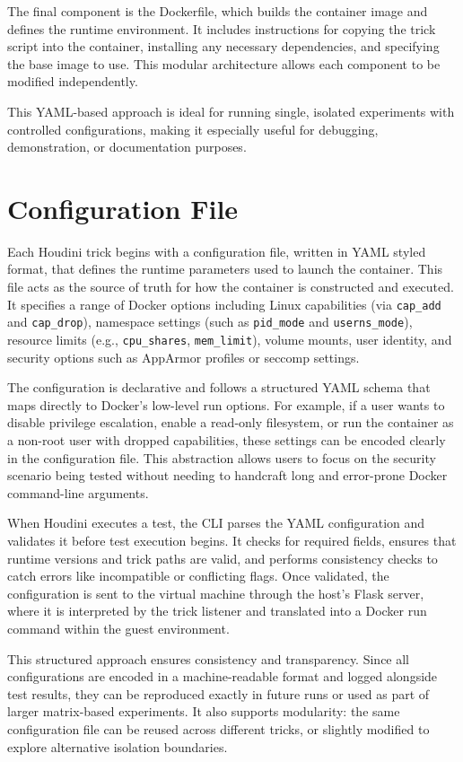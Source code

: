 \documentclass[12pt]{report}
\begin{document}
\begin{doublespace}
The final component is the Dockerfile, which builds the container image and defines the runtime environment. It includes instructions for copying the trick script into the container, installing any necessary dependencies, and specifying the base image to use. This modular architecture allows each component to be modified independently.

This YAML-based approach is ideal for running single, isolated experiments with controlled configurations, making it especially useful for debugging, demonstration, or documentation purposes.

\section{Configuration File}

Each Houdini trick begins with a configuration file, written in YAML styled format, that defines the runtime parameters used to launch the container. This file acts as the source of truth for how the container is constructed and executed. It specifies a range of Docker options including Linux capabilities (via \texttt{cap\_add} and \texttt{cap\_drop}), namespace settings (such as \texttt{pid\_mode} and \texttt{userns\_mode}), resource limits (e.g., \texttt{cpu\_shares}, \texttt{mem\_limit}), volume mounts, user identity, and security options such as AppArmor profiles or seccomp settings.

The configuration is declarative and follows a structured YAML schema that maps directly to Docker’s low-level run options. For example, if a user wants to disable privilege escalation, enable a read-only filesystem, or run the container as a non-root user with dropped capabilities, these settings can be encoded clearly in the configuration file. This abstraction allows users to focus on the security scenario being tested without needing to handcraft long and error-prone Docker command-line arguments.

When Houdini executes a test, the CLI parses the YAML configuration and validates it before test execution begins. It checks for required fields, ensures that runtime versions and trick paths are valid, and performs consistency checks to catch errors like incompatible or conflicting flags. Once validated, the configuration is sent to the virtual machine through the host’s Flask server, where it is interpreted by the trick listener and translated into a Docker run command within the guest environment.

This structured approach ensures consistency and transparency. Since all configurations are encoded in a machine-readable format and logged alongside test results, they can be reproduced exactly in future runs or used as part of larger matrix-based experiments. It also supports modularity: the same configuration file can be reused across different tricks, or slightly modified to explore alternative isolation boundaries.


\end{doublespace}
\end{document}
